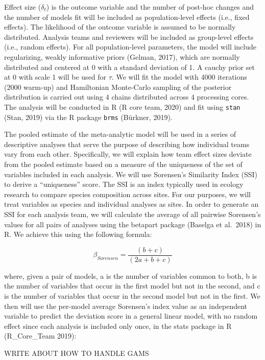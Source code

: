 \documentclass[
  english,
  man]{apa6}
\begin{document}
Effect size (\(\delta_{t}\)) is the outcome variable and the number of post-hoc changes and the number of models fit will be included as population-level effects (i.e., fixed effects).
The likelihood of the outcome variable is assumed to be normally distributed.
Analysis teams and reviewers will be included as group-level effects (i.e., random effects).
For all population-level parameters, the model will include regularizing, weakly informative priors (Gelman, 2017), which are normally distributed and centered at 0 with a standard deviation of 1.
A cauchy prior set at 0 with scale 1 will be used for \(\tau\).
We will fit the model with 4000 iterations (2000 warm-up) and Hamiltonian Monte-Carlo sampling of the posterior distribution is carried out using 4 chains distributed across 4 processing cores.
The analysis will be conducted in R (R core team, 2020) and fit using \texttt{stan} (Stan, 2019) via the R package \texttt{brms} (Bürkner, 2019).

The pooled estimate of the meta-analytic model will be used in a series of descriptive analyses that serve the purpose of describing how individual teams vary from each other.
Specifically, we will explain how team effect sizes deviate from the pooled estimate based on a measure of the uniqueness of the set of variables included in each analysis.
We will use Sorensen's Similarity Index (SSI) to derive a \enquote{uniqueness} score.
The SSI is an index typically used in ecology research to compare species composition across sites.
For our purposes, we will treat variables as species and individual analyses as sites.
In order to generate an SSI for each analysis team, we will calculate the average of all pairwise Sorensen's values for all pairs of analyses using the betapart package (Baselga et al.~2018) in R.
We achieve this using the following formula:

\[\beta_{Sorensen} = \frac{(b+c)}{(2a+b+c)}\]

where, given a pair of models, a is the number of variables common to both, b is the number of variables that occur in the first model but not in the second, and c is the number of variables that occur in the second model but not in the first.
We then will use the per-model average Sorensen's index value as an independent variable to predict the deviation score in a general linear model, with no random effect since each analysis is included only once, in the stats package in R (R\_Core\_Team 2019):

WRITE ABOUT HOW TO HANDLE GAMS
\end{document}
